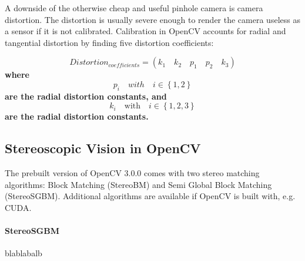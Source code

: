 A downside of the otherwise cheap and useful pinhole camera is camera distortion. The distortion is usually severe enough to render the camera useless as a sensor if it is not calibrated. Calibration in OpenCV accounts for radial and tangential distortion by finding five distortion coefficients:

\begin{equation*}
	 Distortion_{coefficients} = (k_1 \quad k_2 \quad p_1 \quad p_2 \quad k_3)
\end{equation*}
\textbf{where} 
\begin{equation*}
 	p_i \quad with \quad i \in \left\{1, 2\right\}
\end{equation*}
\textbf{are the radial distortion constants, and}
\begin{equation*}
	k_i \quad \textrm{with} \quad i \in \left\{1, 2, 3\right\}  
\end{equation*}
\textbf{are the radial distortion constants.} 

\subsection{Stereoscopic Vision in OpenCV}

The prebuilt version of OpenCV 3.0.0 comes with two stereo matching algorithms: Block Matching (StereoBM) and Semi Global Block Matching (StereoSGBM). Additional algorithms are available if OpenCV is built with, e.g. CUDA.

\paragraph{StereoSGBM}\cite{hirschmullerstereo}
blablabalb
